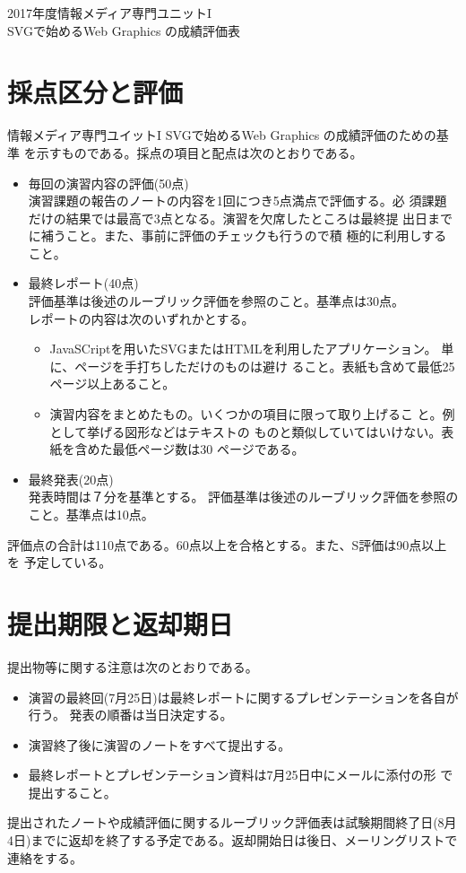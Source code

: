 \documentclass[a4j]{jreport}
\begin{document}
 \begin{center}
  2017年度情報メディア専門ユニットI \\
  {\Large SVGで始めるWeb Graphics の成績評価表}
 \end{center}
 \section{採点区分と評価}
情報メディア専門ユイットI SVGで始めるWeb Graphics の成績評価のための基準
を示すものである。採点の項目と配点は次のとおりである。
\begin{itemize}
 \item 毎回の演習内容の評価(50点)\\
       演習課題の報告のノートの内容を1回につき5点満点で評価する。必
       須課題だけの結果では最高で3点となる。演習を欠席したところは最終提
       出日までに補うこと。また、事前に評価のチェックも行うので積
       極的に利用しすること。
 \item 最終レポート(40点)\\
       評価基準は後述のルーブリック評価を参照のこと。基準点は30点。\\
       レポートの内容は次のいずれかとする。
       \begin{itemize}
        \item JavaSCriptを用いたSVGまたはHTMLを利用したアプリケーション。
              単に、ページを手打ちしただけのものは避け
              ること。表紙も含めて最低25ページ以上あること。
        \item 演習内容をまとめたもの。いくつかの項目に限って取り上げるこ
              と。例として挙げる図形などはテキストの
              ものと類似していてはいけない。表紙を含めた最低ページ数は30
              ページである。
       \end{itemize}
 \item 最終発表(20点)\\
       発表時間は７分を基準とする。
			 評価基準は後述のルーブリック評価を参照のこと。基準点は10点。       
\end{itemize}
評価点の合計は110点である。60点以上を合格とする。また、S評価は90点以上を
予定している。
\section{提出期限と返却期日}
提出物等に関する注意は次のとおりである。
\begin{itemize}
 \item 演習の最終回(7月25日)は最終レポートに関するプレゼンテーションを各自が行う。
       発表の順番は当日決定する。
 \item 演習終了後に演習のノートをすべて提出する。
 \item 最終レポートとプレゼンテーション資料は7月25日中にメールに添付の形
       で提出すること。
\end{itemize}
提出されたノートや成績評価に関するルーブリック評価表は試験期間終了日(8月
4日)までに返却を終了する予定である。返却開始日は後日、メーリングリストで連絡をする。
\end{document}
